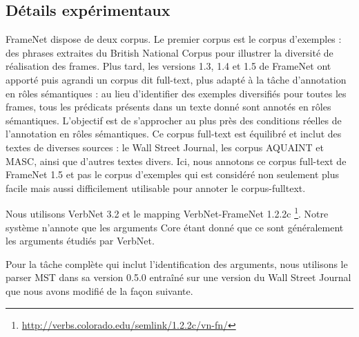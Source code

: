 \subsection{Détails expérimentaux}
\label{subsec:details_exp}

FrameNet dispose de deux corpus. Le premier corpus est le corpus d'exemples :
des phrases extraites du British National Corpus pour illustrer la diversité de
réalisation des frames. Plus tard, les versions 1.3, 1.4 et 1.5 de FrameNet ont
apporté puis agrandi un corpus dit full-text, plus adapté à la tâche
d'annotation en rôles sémantiques : au lieu d'identifier des exemples
diversifiés pour toutes les frames, tous les prédicats présents dans un texte
donné sont annotés en rôles sémantiques. L'objectif est de s'approcher au plus
près des conditions réelles de l'annotation en rôles sémantiques. Ce corpus
full-text est équilibré et inclut des textes de diverses sources : le Wall
Street Journal, les corpus AQUAINT et MASC, ainsi que d'autres textes divers.
Ici, nous annotons ce corpus full-text de FrameNet 1.5 et pas le corpus
d'exemples qui est considéré non seulement plus facile mais aussi difficilement
utilisable pour annoter le corpus-fulltext.

Nous utilisons VerbNet 3.2 et le mapping VerbNet-FrameNet 1.2.2c
\footnote{\url{http://verbs.colorado.edu/semlink/1.2.2c/vn-fn/}}. Notre système
n'annote que les arguments Core étant donné que ce sont généralement les
arguments étudiés par VerbNet.

Pour la tâche complète qui inclut l'identification des arguments, nous
utilisons le parser MST dans sa version 0.5.0 \citep{mcdonald2006multilingual}
entraîné sur une version du Wall Street Journal que nous avons modifié de la
façon suivante.

